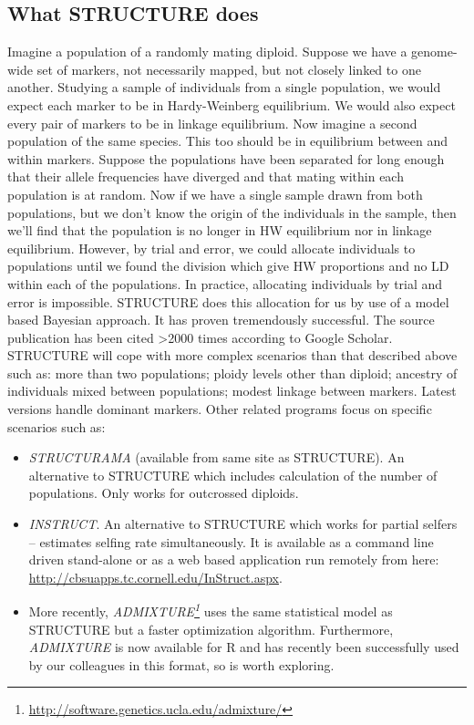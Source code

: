\documentclass[
]{book}
\renewcommand{\href}[2]{#2\footnote{\url{#1}}}
\begin{document}
\hypertarget{what-structure-does}{%
\subsection{What STRUCTURE does}\label{what-structure-does}}

Imagine a population of a randomly mating diploid. Suppose we have a genome-wide set of markers, not necessarily mapped, but not closely linked to one another. Studying a sample of individuals from a single population, we would expect each marker to be in Hardy-Weinberg equilibrium. We would also expect every pair of markers to be in linkage equilibrium. Now imagine a second population of the same species. This too should be in equilibrium between and within markers. Suppose the populations have been separated for long enough that their allele frequencies have diverged and that mating within each population is at random. Now if we have a single sample drawn from both populations, but we don't know the origin of the individuals in the sample, then we'll find that the population is no longer in HW equilibrium nor in linkage equilibrium. However, by trial and error, we could allocate individuals to populations until we found the division which give HW proportions and no LD within each of the populations. In practice, allocating individuals by trial and error is impossible. STRUCTURE does this allocation for us by use of a model based Bayesian approach. It has proven tremendously successful. The source publication has been cited \textgreater2000 times according to Google Scholar. STRUCTURE will cope with more complex scenarios than that described above such as: more than two populations; ploidy levels other than diploid; ancestry of individuals mixed between populations; modest linkage between markers. Latest versions handle dominant markers. Other related programs focus on specific scenarios such as:

\begin{itemize}
\item
  \emph{STRUCTURAMA} (available from same site as STRUCTURE). An alternative to STRUCTURE which includes calculation of the number of populations. Only works for outcrossed diploids.
\item
  \emph{INSTRUCT}. An alternative to STRUCTURE which works for partial selfers -- estimates selfing rate simultaneously. It is available as a command line driven stand-alone or as a web based application run remotely from here: \url{http://cbsuapps.tc.cornell.edu/InStruct.aspx}.
\item
  More recently, \emph{\href{http://software.genetics.ucla.edu/admixture/}{ADMIXTURE}} uses the same statistical model as STRUCTURE but a faster optimization algorithm. Furthermore, \emph{ADMIXTURE} is now available for R and has recently been successfully used by our colleagues in this format, so is worth exploring.
\end{itemize}
\end{document}
